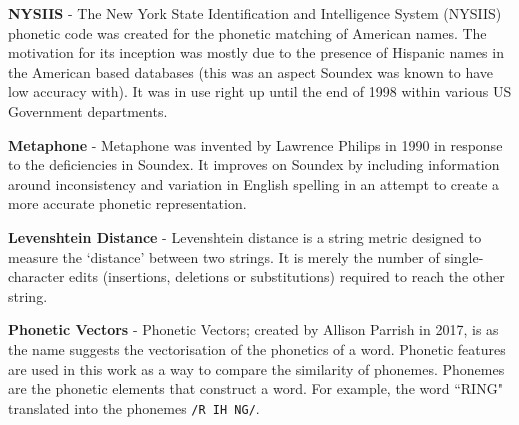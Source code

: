 \textbf{NYSIIS} - The New York State Identification and Intelligence System (NYSIIS) phonetic code was created for the phonetic matching of American names. The motivation for its inception was mostly due to the presence of Hispanic names in the American based databases (this was an aspect Soundex was known to have low accuracy with). It was in use right up until the end of 1998 within various US Government departments.

\textbf{Metaphone} - Metaphone was invented by Lawrence Philips in 1990\cite{philips1990hanging} in response to the deficiencies in Soundex. It improves on Soundex by including information around inconsistency and variation in English spelling in an attempt to create a more accurate phonetic representation.

\textbf{Levenshtein Distance} - Levenshtein distance is a string metric designed to measure the `distance' between two strings. It is merely the number of single-character edits (insertions, deletions or substitutions) required to reach the other string.

\textbf{Phonetic Vectors} - Phonetic Vectors; created by Allison Parrish in 2017\cite{parrish2017poetic}, is as the name suggests the vectorisation of the phonetics of a word. Phonetic features are used in this work as a way to compare the similarity of phonemes. Phonemes are the phonetic elements that construct a word. For example, the word ``RING" translated into the phonemes \verb|/R IH NG/|. 




